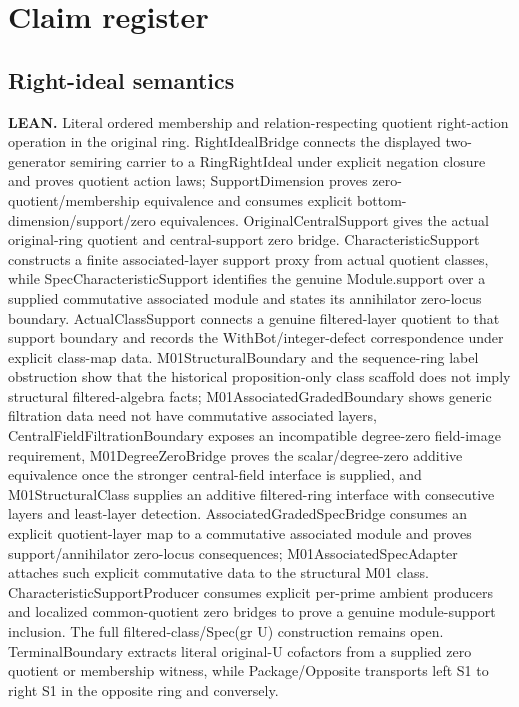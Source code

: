\section{Claim register}\label{sec:claims}
\subsection{Right-ideal semantics}\hypertarget{claim:semantics}{}\backmap
\textbf{LEAN.} Literal ordered membership and relation-respecting quotient right-action operation in the original ring. RightIdealBridge connects the displayed two-generator semiring carrier to a RingRightIdeal under explicit negation closure and proves quotient action laws; SupportDimension proves zero-quotient/membership equivalence and consumes explicit bottom-dimension/support/zero equivalences. OriginalCentralSupport gives the actual original-ring quotient and central-support zero bridge. CharacteristicSupport constructs a finite associated-layer support proxy from actual quotient classes, while SpecCharacteristicSupport identifies the genuine Module.support over a supplied commutative associated module and states its annihilator zero-locus boundary. ActualClassSupport connects a genuine filtered-layer quotient to that support boundary and records the WithBot/integer-defect correspondence under explicit class-map data. M01StructuralBoundary and the sequence-ring label obstruction show that the historical proposition-only class scaffold does not imply structural filtered-algebra facts; M01AssociatedGradedBoundary shows generic filtration data need not have commutative associated layers, CentralFieldFiltrationBoundary exposes an incompatible degree-zero field-image requirement, M01DegreeZeroBridge proves the scalar/degree-zero additive equivalence once the stronger central-field interface is supplied, and M01StructuralClass supplies an additive filtered-ring interface with consecutive layers and least-layer detection. AssociatedGradedSpecBridge consumes an explicit quotient-layer map to a commutative associated module and proves support/annihilator zero-locus consequences; M01AssociatedSpecAdapter attaches such explicit commutative data to the structural M01 class. CharacteristicSupportProducer consumes explicit per-prime ambient producers and localized common-quotient zero bridges to prove a genuine module-support inclusion. The full filtered-class/Spec(gr U) construction remains open. TerminalBoundary extracts literal original-U cofactors from a supplied zero quotient or membership witness, while Package/Opposite transports left S1 to right S1 in the opposite ring and conversely.

